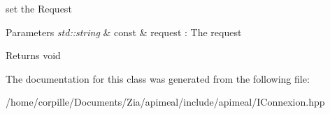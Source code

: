 set the Request 


\begin{DoxyParams}{Parameters}
{\em std\-::string} & const \& request \-: The request \\
\hline
\end{DoxyParams}
\begin{DoxyReturn}{Returns}
void 
\end{DoxyReturn}


The documentation for this class was generated from the following file\-:\begin{DoxyCompactItemize}
\item 
/home/corpille/\-Documents/\-Zia/apimeal/include/apimeal/I\-Connexion.\-hpp\end{DoxyCompactItemize}
